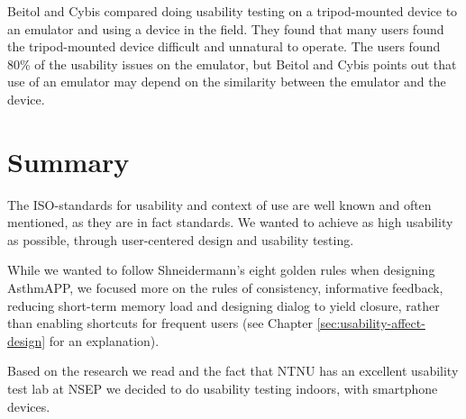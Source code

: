 Beitol and Cybis\cite{betiol2005usability} compared doing usability testing on a tripod-mounted device to an emulator and using a device in the field. They found that many users found the tripod-mounted device difficult and unnatural to operate. The users found 80\% of the usability issues on the emulator, but Beitol and Cybis points out that use of an emulator may depend on the similarity between the emulator and the device. 



\section{Summary}
\label{sec:usabilitysummary}

The ISO-standards for usability and context of use\cite{isousability} are well known and often mentioned, as they are in fact standards. We wanted to achieve as high usability as possible, through user-centered design and usability testing. 

While we wanted to follow Shneidermann's eight golden rules\cite{shneiderman2003designing} when designing AsthmAPP, we focused more on the rules of consistency, informative feedback, reducing short-term memory load and designing dialog to yield closure, rather than enabling shortcuts for frequent users (see Chapter \ref{sec:usability-affect-design} for an explanation).

Based on the research we read and the fact that NTNU has an excellent usability test lab at NSEP we decided to do usability testing indoors, with smartphone devices. 